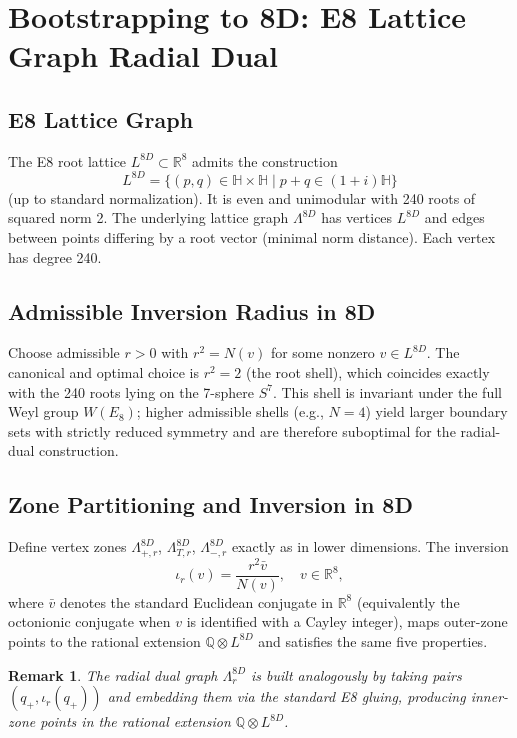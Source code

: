 \documentclass{article}
\newtheorem{remark}{Remark}
\begin{document}
\section{Bootstrapping to 8D: E8 Lattice Graph Radial Dual}
\label{sec:bootstrapping-8d}
\subsection{E8 Lattice Graph}
The E8 root lattice \(L^{8D} \subset \mathbb{R}^8\) admits the construction
\[
L^{8D} = \{ (p, q) \in \mathbb{H} \times \mathbb{H} \mid p + q \in (1+i)\mathbb{H} \}
\]
(up to standard normalization). It is even and unimodular with 240 roots of squared norm 2.\cite{ConwaySloane1999} The underlying lattice graph \(\Lambda^{8D}\) has vertices \(L^{8D}\) and edges between points differing by a root vector (minimal norm distance). Each vertex has degree 240.
\subsection{Admissible Inversion Radius in 8D}
Choose admissible \(r > 0\) with \(r^2 = N(v)\) for some nonzero \(v \in L^{8D}\). The canonical and optimal choice is \(r^2 = 2\) (the root shell), which coincides exactly with the 240 roots lying on the 7-sphere \(S^7\). This shell is invariant under the full Weyl group \(W(E_8)\); higher admissible shells (e.g., \(N=4\)) yield larger boundary sets with strictly reduced symmetry and are therefore suboptimal for the radial-dual construction.
\subsection{Zone Partitioning and Inversion in 8D}
Define vertex zones \(\Lambda_{+,r}^{8D}\), \(\Lambda_{T,r}^{8D}\), \(\Lambda_{-,r}^{8D}\) exactly as in lower dimensions. The inversion
\[
\iota_r(v) = \frac{r^2 \bar{v}}{N(v)}, \quad v \in \mathbb{R}^8,
\]
where \(\bar{v}\) denotes the standard Euclidean conjugate in \(\mathbb{R}^8\) (equivalently the octonionic conjugate when \(v\) is identified with a Cayley integer), maps outer-zone points to the rational extension \(\mathbb{Q} \otimes L^{8D}\) and satisfies the same five properties.
\begin{remark}
The radial dual graph \(\Lambda_r^{8D}\) is built analogously by taking pairs \((q_+, \iota_r(q_+))\) and embedding them via the standard E8 gluing, producing inner-zone points in the rational extension \(\mathbb{Q} \otimes L^{8D}\).
\end{remark}
\end{document}
